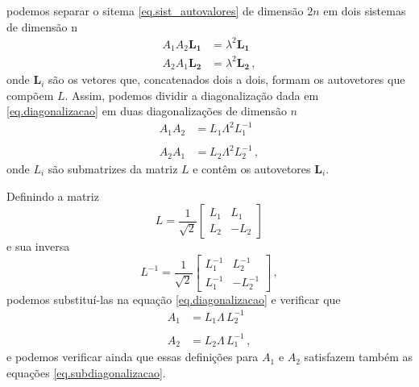 podemos separar o sitema \ref{eq.sist_autovalores} de dimens\~ao $2n$ em dois sistemas de dimens\~ao n
\begin{align*}
A_1A_2\mathbf{L_1}&=\lambda^2\mathbf{L_1}\\
A_2A_1\mathbf{L_2}&=\lambda^2\mathbf{L_2}\,,
\end{align*}
onde $\mathbf{L}_i$ s\~ao os vetores que, concatenados dois a dois, formam os autovetores que comp\~oem $L$.
Assim, podemos dividir a diagonaliza\c{c}\~ao dada em \ref{eq.diagonalizacao} em duas diagonaliza\c{c}\~oes de dimens\~ao $n$
\begin{align}\label{eq.subdiagonalizacao}\nonumber
A_1A_2&=L_1\Lambda^2L_1^{-1}\\\quad\\\nonumber
A_2A_1&=L_2\Lambda^2L_2^{-1}\,,
\end{align}
onde $L_i$ s\~ao submatrizes da matriz $L$ e cont\^em os autovetores $\mathbf{L}_i$.



Definindo a matriz 
\begin{equation}\label{eq.L}
L=\frac{1}{\sqrt{2}}
\begin{bmatrix}
L_1&L_1\\
L_2&-L_2
\end{bmatrix}
\end{equation}
e sua inversa
\begin{equation}\label{eq.L_inversa}
L^{-1}=\frac{1}{\sqrt{2}}
\begin{bmatrix}
L_1^{-1}&L_2^{-1}\\
L_1^{-1}&-L_2^{-1}
\end{bmatrix}\,,
\end{equation}
podemos substitu\'i-las na equa\c{c}\~ao \ref{eq.diagonalizacao} e verificar que 
\begin{align}\label{eq.definicao_A1_A2}\nonumber
A_1&=L_1\Lambda\,L_2^{-1}\\\quad\\\nonumber
A_2&=L_2\Lambda\,L_1^{-1}\,,
\end{align}
e podemos verificar ainda que essas defini\c{c}\~oes para $A_1$ e $A_2$ satisfazem tamb\'em as equa\c{c}\~oes \ref{eq.subdiagonalizacao}.

